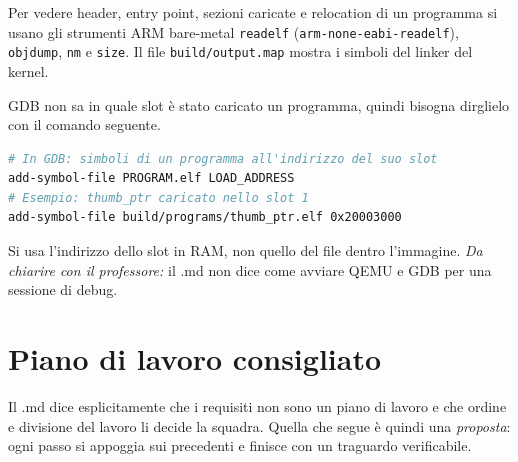 Per vedere header, entry point, sezioni caricate e relocation di un programma si usano gli strumenti ARM bare-metal \texttt{readelf} (\texttt{arm-none-eabi-readelf}), \texttt{objdump}, \texttt{nm} e \texttt{size}. Il file \texttt{build/output.map} mostra i simboli del linker del kernel.

GDB non sa in quale slot è stato caricato un programma, quindi bisogna dirglielo con il comando seguente.
\begin{lstlisting}[language=bash]
# In GDB: simboli di un programma all'indirizzo del suo slot
add-symbol-file PROGRAM.elf LOAD_ADDRESS
# Esempio: thumb_ptr caricato nello slot 1
add-symbol-file build/programs/thumb_ptr.elf 0x20003000
\end{lstlisting}
Si usa l'indirizzo dello slot in RAM, non quello del file dentro l'immagine. \emph{Da chiarire con il professore:} il .md non dice come avviare QEMU e GDB per una sessione di debug.

\section{Piano di lavoro consigliato}

Il .md dice esplicitamente che i requisiti non sono un piano di lavoro e che ordine e divisione del lavoro li decide la squadra. Quella che segue è quindi una \emph{proposta}: ogni passo si appoggia sui precedenti e finisce con un traguardo verificabile.

